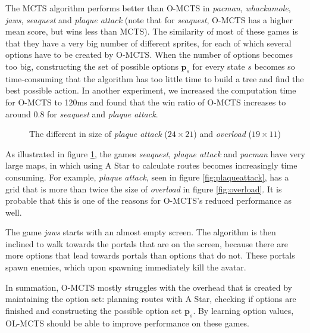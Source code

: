 The MCTS algorithm performs better than O-MCTS in \textit{pacman},
\textit{whackamole}, \textit{jaws}, \textit{seaquest} and \textit{plaque attack}
(note that for \textit{seaquest}, O-MCTS has a higher mean score, but wins less
than MCTS). The similarity of most of these games is that they have a very big
number of different sprites, for each of which several options have to be
created by O-MCTS. When the number of options becomes too big, constructing the
set of possible options $\mathbf{p}_s$ for every state $s$ becomes so
time-consuming that the algorithm has too little time to build a tree and find
the best possible action. In another experiment, we increased the computation
time for O-MCTS to 120ms and found that the win ratio of O-MCTS increases to
around $0.8$ for \textit{seaquest} and \textit{plaque attack}.

\begin{figure}
	\centering
	\caption{The different in size of \textit{plaque attack} ($24\times21$) and 
		\textit{overload} ($19\times11$)}
	\label{fig:game-size}
\end{figure}

As illustrated in figure \ref{fig:game-size}, the games \textit{seaquest},
\textit{plaque attack} and \textit{pacman} have very large maps, in which using
A Star to calculate routes becomes increasingly time consuming. For example,
\textit{plaque attack}, seen in figure \ref{fig:plaqueattack}, has a grid that
is more than twice the size of \textit{overload} in figure \ref{fig:overload}.
It is probable that this is one of the reasons for O-MCTS's reduced performance
as well.

The game \textit{jaws} starts with an almost empty screen. The algorithm is then
inclined to walk towards the portals that are on the screen, because there are
more options that lead towards portals than options that do not. These portals
spawn enemies, which upon spawning immediately kill the avatar. 

In summation, O-MCTS mostly struggles with the overhead that is created by
maintaining the option set: planning routes with A Star, checking if options are
finished and constructing the possible option set $\mathbf{p}_s$. By learning
option values, OL-MCTS should be able to improve performance on these games.

